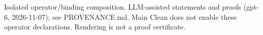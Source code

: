 \documentclass[11pt]{article}
\begin{document}

\bigskip
{\footnotesize Isolated operator/binding composition. LLM-assisted statements and
proofs (gpt-6, 2026-11-07); see PROVENANCE.md. Main Clean does not enable these
operator declarations. Rendering is not a proof certificate.}
\end{document}
